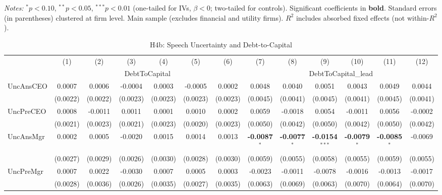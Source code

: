 \documentclass[11pt,a4paper]{article}
\begin{document}
\begin{table}[htbp]
\begin{tabular}{lcccccccccccc}
\bottomrule
\end{tabular}
\begin{minipage}{\linewidth}
\vspace{2pt}\scriptsize
\textit{Notes:} $^{*}p<0.10$, $^{**}p<0.05$, $^{***}p<0.01$ (one-tailed for IVs, $\beta < 0$; two-tailed for controls).
 Significant coefficients in \textbf{bold}.
 Standard errors (in parentheses) clustered at firm level.
 Main sample (excludes financial and utility firms).
 $R^2$ includes absorbed fixed effects (not within-$R^2$).
\end{minipage}
\end{table}
\clearpage
\begin{table}[htbp]
\centering
\caption{H4b: Speech Uncertainty and Debt-to-Capital}
\label{tab:h4b}
\scriptsize
\begin{tabular}{lcccccccccccc}
\toprule
 & (1) & (2) & (3) & (4) & (5) & (6) & (7) & (8) & (9) & (10) & (11) & (12) \\
 & \multicolumn{6}{c}{DebtToCapital} & \multicolumn{6}{c}{DebtToCapital\_lead} \\
\cmidrule(lr){2-7} \cmidrule(lr){8-13}
\midrule
UncAnsCEO & 0.0007 & 0.0006 & -0.0004 & 0.0003 & -0.0005 & 0.0002 & 0.0048 & 0.0040 & 0.0051 & 0.0043 & 0.0049 & 0.0044 \\
 & (0.0022) & (0.0022) & (0.0023) & (0.0023) & (0.0023) & (0.0023) & (0.0045) & (0.0041) & (0.0045) & (0.0041) & (0.0045) & (0.0041) \\
UncPreCEO & 0.0008 & -0.0011 & 0.0011 & 0.0001 & 0.0010 & 0.0002 & 0.0059 & -0.0018 & 0.0054 & -0.0011 & 0.0056 & -0.0002 \\
 & (0.0021) & (0.0023) & (0.0021) & (0.0023) & (0.0020) & (0.0023) & (0.0050) & (0.0042) & (0.0050) & (0.0042) & (0.0050) & (0.0042) \\
UncAnsMgr & 0.0002 & 0.0005 & -0.0020 & 0.0015 & 0.0014 & 0.0013 & \textbf{-0.0087}$^{*}$ & \textbf{-0.0077}$^{*}$ & \textbf{-0.0154}$^{***}$ & \textbf{-0.0079}$^{*}$ & \textbf{-0.0085}$^{*}$ & -0.0069 \\
 & (0.0027) & (0.0029) & (0.0026) & (0.0030) & (0.0028) & (0.0030) & (0.0059) & (0.0055) & (0.0058) & (0.0055) & (0.0059) & (0.0055) \\
UncPreMgr & 0.0007 & 0.0022 & -0.0030 & 0.0007 & 0.0005 & 0.0003 & -0.0023 & -0.0011 & -0.0078 & -0.0016 & -0.0013 & -0.0017 \\
 & (0.0028) & (0.0036) & (0.0026) & (0.0035) & (0.0027) & (0.0035) & (0.0063) & (0.0069) & (0.0063) & (0.0070) & (0.0064) & (0.0070) \\

\end{tabular}
\end{table}
\end{document}
